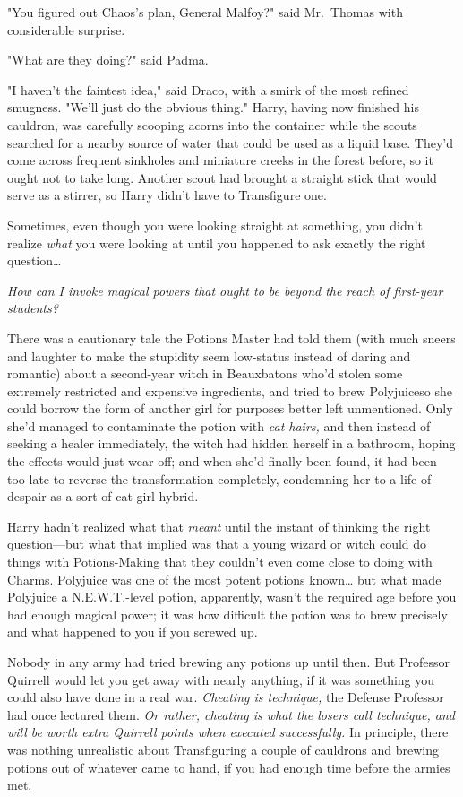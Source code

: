 "You figured out Chaos's plan, General Malfoy?" said Mr.~Thomas with 
considerable surprise.

"What are they doing?" said Padma.

"I haven't the faintest idea," said Draco, with a smirk of the most refined 
smugness. "We'll just do the obvious thing."
\sbreak
Harry, having now finished his cauldron, was carefully scooping acorns into the 
container while the scouts searched for a nearby source of water that could be 
used as a liquid base. They'd come across frequent sinkholes and miniature 
creeks in the forest before, so it ought not to take long. Another scout had 
brought a straight stick that would serve as a stirrer, so Harry didn't have to 
Transfigure one.

Sometimes, even though you were looking straight at something, you didn't 
realize \emph{what} you were looking at until you happened to ask exactly the 
right question{\ldots}

\emph{How can I invoke magical powers that ought to be beyond the reach of 
first-year students?}

There was a cautionary tale the Potions Master had told them (with much sneers 
and laughter to make the stupidity seem low-status instead of daring and 
romantic) about a second-year witch in Beauxbatons who'd stolen some extremely 
restricted and expensive ingredients, and tried to brew Polyjuiceso she could 
borrow the form of another girl for purposes better left unmentioned. Only 
she'd managed to contaminate the potion with \emph{cat hairs,} and then instead 
of seeking a healer immediately, the witch had hidden herself in a bathroom, 
hoping the effects would just wear off; and when she'd finally been found, it 
had been too late to reverse the transformation completely, condemning her to a 
life of despair as a sort of cat-girl hybrid.

Harry hadn't realized what that \emph{meant} until the instant of thinking the 
right question---but what that implied was that a young wizard or witch could 
do things with Potions-Making that they couldn't even come close to doing with 
Charms. Polyjuice was one of the most potent potions known{\ldots} but what 
made Polyjuice a N.E.W.T.-level potion, apparently, wasn't the required age 
before you had enough magical power; it was how difficult the potion was to 
brew precisely and what happened to you if you screwed up.

Nobody in any army had tried brewing any potions up until then. But Professor 
Quirrell would let you get away with nearly anything, if it was something you 
could also have done in a real war. \emph{Cheating is technique,} the Defense 
Professor had once lectured them. \emph{Or rather, cheating is what the losers 
call technique, and will be worth extra Quirrell points when executed 
successfully.} In principle, there was nothing unrealistic about Transfiguring 
a couple of cauldrons and brewing potions out of whatever came to hand, if you 
had enough time before the armies met.

